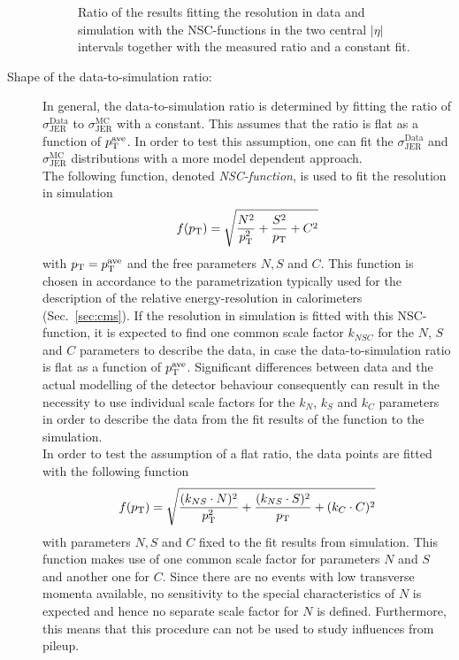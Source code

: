 \begin{description}
\begin{figure}[!p]
\begin{tabular}{cc}
  \end{tabular}
  \caption{Ratio of the results fitting the resolution in data and simulation with the NSC-functions in the two central $|\eta|$ intervals together with the measured ratio and a constant fit.}
  \label{fig:NSC_Fits_ratio}
\end{figure} 

\item[Shape of the data-to-simulation ratio:] In general, the data-to-simulation ratio is determined by fitting the ratio of $\sigma^\mathrm{Data}_\mathrm{JER}$ to $\sigma^\mathrm{MC}_\mathrm{JER}$ with a constant. This assumes that the ratio is flat as a function of $p_{\text{T}}^\mathrm{ave}$. In order to test this assumption, one can fit the $\sigma^\mathrm{Data}_\mathrm{JER}$ and $\sigma^\mathrm{MC}_\mathrm{JER}$ distributions with a more model dependent approach. \\ 
The following function, denoted \textit{NSC-function}, is used to fit the resolution in simulation
\begin{equation}
f(p_{\text{T}}) = \sqrt{\frac{N^2}{p_{\text{T}}^{2}} + \frac{S^2}{p_{\text{T}}} + C^2}
\label{eq:NSC}
\end{equation}
with $p_{\text{T}}=p_{\text{T}}^\mathrm{ave}$ and the free parameters $N, S$ and $C$. This function is chosen in accordance to the parametrization typically used for the description of the relative energy-resolution in calorimeters (\cf Sec.~\ref{sec:cms}). If the resolution in simulation is fitted with this NSC-function, it is expected to find one common scale factor $k_{NSC}$ for the $N$, $S$ and $C$ parameters to describe the data, in case the data-to-simulation ratio is flat as a function of $p_{\text{T}}^\mathrm{ave}$. Significant differences between data and the actual modelling of the detector behaviour consequently can result in the necessity to use individual scale factors for the $k_N$, $k_S$ and $k_C$ parameters in order to describe the data from the fit results of the function to the simulation. \\
In order to test the assumption of a flat ratio, the data points are fitted with the following function 
\begin{equation}
f(p_{\text{T}}) = \sqrt{\frac{(k_{NS} \cdot N)^2}{p_{\text{T}}^{2}} + \frac{(k_{NS} \cdot S)^2}{p_{\text{T}}} + (k_{C} \cdot C)^2} 
\end{equation} 
with parameters $N, S$ and $C$ fixed to the fit results from simulation. This function makes use of one common scale factor for parameters $N$ and $S$ and another one for $C$. Since there are no events with low transverse momenta available, no sensitivity to the special characteristics of $N$ is expected and hence no separate scale factor for $N$ is defined. Furthermore, this means that this procedure can not be used to study influences from pileup. \\

\end{description}

